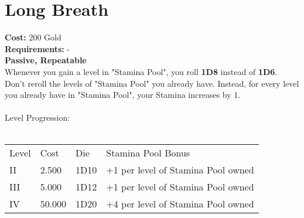 \section*{Long Breath}\label{sec:longbreath}
\textbf{Cost:} 200 Gold\\
\textbf{Requirements:} -\\
\textbf{Passive, Repeatable}\\
Whenever you gain a level in "Stamina Pool", you roll \textbf{1D8} instead of \textbf{1D6}.
Don't reroll the levels of "Stamina Pool" you already have.
Instead, for every level you already have in "Stamina Pool", your Stamina increases by 1.\\
\\
Level Progression:\\
\\
\begin{tabular}{l | l | l | l}
    Level & Cost & Die & Stamina Pool Bonus\\
    II & 2.500 & 1D10 & +1 per level of Stamina Pool owned\\
    III & 5.000 & 1D12 & +1 per level of Stamina Pool owned\\
    IV & 50.000 & 1D20 & +4 per level of Stamina Pool owned\\
\end{tabular}
